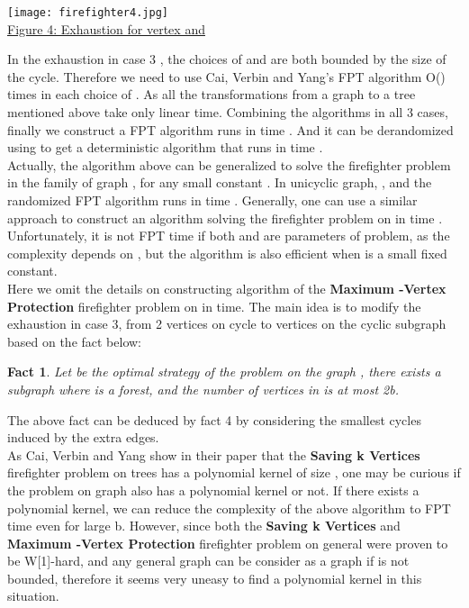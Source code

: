\documentclass[11pt,letter]{article}
\newtheorem{Fact}{Fact}
\begin{document}
\begin{center}
\texttt{[image: firefighter4.jpg]}\\
\underline{Figure 4: Exhaustion for vertex  and }
\end{center}

In the exhaustion in case 3 , the choices of  and  are both bounded by the size of the cycle. Therefore we need to use Cai, Verbin and Yang's FPT algorithm O() times in each choice of . As all the transformations from a graph  to a tree  mentioned above take only linear time. Combining the algorithms in all 3 cases, finally we construct a FPT algorithm runs in time . And it can be derandomized using  to get a deterministic algorithm that runs in time .\\

Actually, the algorithm above can be generalized to solve the firefighter problem in the family of graph , for any small constant . In unicyclic graph, , and the randomized FPT algorithm runs in time . Generally, one can use a similar approach to construct an algorithm solving the firefighter problem on  in time . Unfortunately, it is not FPT time if both  and  are parameters of problem, as the complexity depends on , but the algorithm is also efficient when  is a small fixed constant.\\

Here we omit the details on constructing algorithm of the \textbf{Maximum -Vertex Protection} firefighter problem on  in  time. The main idea is to modify the exhaustion in case 3, from 2 vertices  on cycle  to  vertices  on the cyclic subgraph based on the fact below:

\begin{Fact}
Let  be the optimal strategy of the problem on the  graph , there exists a subgraph  where  is a forest, and the number of vertices in  is at most 2b.
\end{Fact}

The above fact can be deduced by fact 4 by considering the  smallest cycles induced by the extra  edges.\\

As Cai, Verbin and Yang show in their paper that the \textbf{Saving k Vertices} firefighter problem on trees has a polynomial kernel of size  \cite{CVY08}, one may be curious if the problem on  graph also has a polynomial kernel or not. If there exists a polynomial kernel, we can reduce the complexity of the above algorithm to FPT time even for large b. However, since both the \textbf{Saving k Vertices} and \textbf{Maximum -Vertex Protection} firefighter problem on general were proven to be W[1]-hard, and any general graph can be consider as a  graph if  is not bounded, therefore it seems very uneasy to find a polynomial kernel in this situation.
\end{document}
